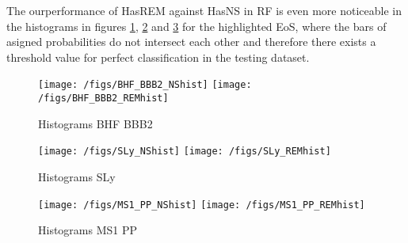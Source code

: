 The ourperformance of HasREM against HasNS in RF is even more noticeable in the histograms in figures \ref{fig:RF_hist_BHFBBB2}, \ref{fig:RF_hist_SLY} and \ref{fig:RF_hist_MS1PP} for the highlighted EoS, where the bars of asigned probabilities do not intersect each other and therefore there exists a threshold value for perfect classification in the testing dataset.

\begin{figure}
\centering
\texttt{[image: /figs/BHF\_BBB2\_NShist]}
\texttt{[image: /figs/BHF\_BBB2\_REMhist]}
\caption{\label{fig:RF_hist_BHFBBB2} Histograms BHF BBB2}
\end{figure}

\begin{figure}
\centering
\texttt{[image: /figs/SLy\_NShist]}
\texttt{[image: /figs/SLy\_REMhist]}
\caption{\label{fig:RF_hist_SLY} Histograms SLy}
\end{figure}

\begin{figure}
\centering
\texttt{[image: /figs/MS1\_PP\_NShist]}
\texttt{[image: /figs/MS1\_PP\_REMhist]}
\caption{\label{fig:RF_hist_MS1PP} Histograms MS1 PP}
\end{figure}
